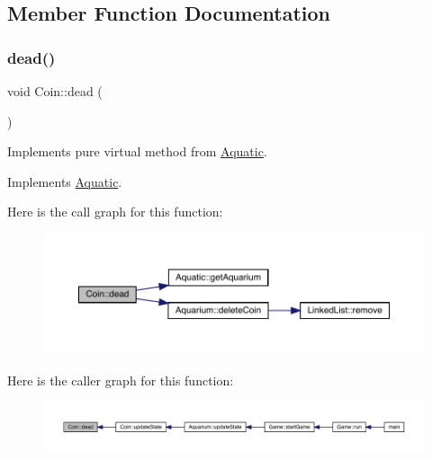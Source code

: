 \subsection{Member Function Documentation}
\mbox{\label{class_coin_af0c650f68a63698691c574fbef940776}} 
\subsubsection{\texorpdfstring{dead()}{dead()}}
{\footnotesize\ttfamily void Coin\+::dead (\begin{DoxyParamCaption}{ }\end{DoxyParamCaption})\hspace{0.3cm}{\ttfamily [virtual]}}



Implements pure virtual method from \mbox{\hyperlink{class_aquatic}{Aquatic}}. 



Implements \mbox{\hyperlink{class_aquatic_a22fdb11e9cfec922fe50638709768276}{Aquatic}}.

Here is the call graph for this function\+:\nopagebreak
\begin{figure}[H]
\begin{center}
\leavevmode
\includegraphics[width=350pt]{class_coin_af0c650f68a63698691c574fbef940776_cgraph}
\end{center}
\end{figure}
Here is the caller graph for this function\+:\nopagebreak
\begin{figure}[H]
\begin{center}
\leavevmode
\includegraphics[width=350pt]{class_coin_af0c650f68a63698691c574fbef940776_icgraph}
\end{center}
\end{figure}
\mbox{\label{class_coin_a53c8bf65afdde1422cfda51d753d74b7}} 
